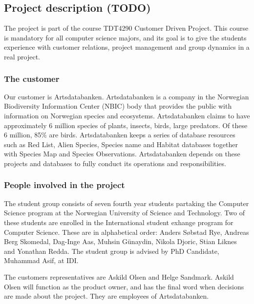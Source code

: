 \subsection{Project description (TODO)}
The project is part of the course TDT4290 Customer Driven Project. This course is mandatory for all computer science majors, and its goal is to give the students experience with customer relations, project management and group dynamics in a real project.

\subsubsection{The customer}
Our customer is Artsdatabanken. Artsdatabanken is a company in the
Norwegian Biodiversity Information Center (NBIC) body that provides the
public with information on Norwegian species and ecosystems.
Artsdatabanken claims to have approximately 6 million species of plants,
insects, birds, large predators. Of these 6 million, 85\% are birds. 
Artsdatabanken keeps a series of database resources such as Red List,
Alien Species, Species name and Habitat databases together with Species
Map and Species Observations. Artsdatabanken depends on these projects
and databases to fully conduct its operations and
responsibilities.\cite{artsdatabanken:about} 

\subsubsection{People involved in the project}
The student group consists of seven fourth year students partaking the Computer Science program at the Norwegian University of Science and Technology. Two of these students are enrolled in the International student exhange program for Computer Science. These are in alphabetical order: Anders Søbstad Rye, Andreas Berg Skomedal, Dag-Inge Aas, Muhsin Günaydin, Nikola Djoric, Stian Liknes and Yonathan Redda. The student group is advised by PhD Candidate, Muhammad Asif, at IDI.

The customers representatives are Askild Olsen and Helge Sandmark. Askild Olsen will function as the product owner, and has the final word when decisions are made about the project. They are employees of Artsdatabanken.


